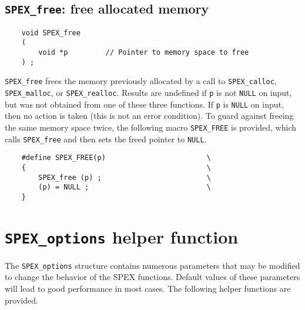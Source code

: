 \documentclass[12pt,oneside]{book}
\theoremstyle{definition}
\begin{document}
\newpage
\subsection{\texttt{SPEX\_free}: free allocated memory} \label{ss:SPEX_free}
\begin{mdframed}[userdefinedwidth=\textwidth]
{\footnotesize
\begin{verbatim}
    void SPEX_free
    (
        void *p         // Pointer to memory space to free
    ) ;
\end{verbatim}
} \end{mdframed}

\verb|SPEX_free| frees the memory previously allocated by a call to
\verb|SPEX_calloc|, \verb|SPEX_malloc|, or \verb|SPEX_realloc|.
Results are undefined if \verb'p' is not \verb'NULL' on input, but was not obtained from one of these three functions.
If \verb|p| is
\verb|NULL| on input, then no action is taken (this is not an error condition).
To guard against freeing the same memory space twice, the following macro
\verb|SPEX_FREE| is provided, which calls \verb|SPEX_free| and then sets the
freed pointer to \verb|NULL|.

\begin{mdframed}[userdefinedwidth=\textwidth]
{\footnotesize
\begin{verbatim}
    #define SPEX_FREE(p)                        \
    {                                           \
        SPEX_free (p) ;                         \
        (p) = NULL ;                            \
    }
\end{verbatim}
} \end{mdframed}



\section{\texttt{SPEX\_options} helper function} \label{ss:SPEX_options}
The \verb|SPEX_options| structure contains numerous parameters that may be
modified to change the behavior of the SPEX functions.  Default values of
these parameters will lead to good performance in most cases. The following helper functions
are provided.
\end{document}
